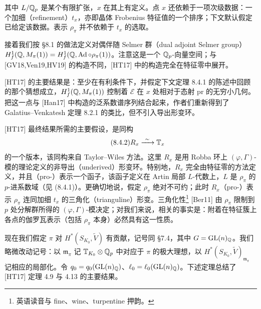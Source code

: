
其中 $L/\mathbb{Q}_p$ 是某个有限扩张，$x$ 在其上有定义。点 $x$ 还依赖于一项次级数据：一个加细（refinement）$t_x$，亦即晶体 Frobenius 特征值的一个排序；下文默认假定已给定该数据。表示 $\rho_\pi$ 并不依赖于 $t_x$ 的选取。

接着我们按 §8.1 的做法定义对偶伴随 Selmer 群（dual adjoint Selmer group）$H^1_f(\mathbb{Q},M_\pi(1))=H^1_f(\mathbb{Q},\operatorname{Ad}\circ\rho_\pi(1))$。注意这是一个 $\mathbb{Q}_p$-向量空间；与 [GV18,Ven19,HV19] 的构造不同，[HT17] 中的构造完全在特征零中展开。

[HT17] 的主要结果是：至少在有利条件下，并假定下文定理 8.4.1 的陈述中回顾的那个猜想成立，$H^1_f(\mathbb{Q},M_\pi(1))$ 控制着 $\mathcal E$ 在 $x$ 处相对于态射 $\mathrm{pr}$ 的无穷小几何。把这一点与 [Han17] 中构造的泛系数谱序列结合起来，作者们重新得到了 Galatius–Venkatesh 定理 8.2.1 的类比，但不引入导出形变环。

[HT17] 最终结果所需的主要假设，是同构
\begin{equation}\tag{8.4.2}\label{eq:a6-06-1}
R_x\xrightarrow{\ \sim\ }\mathbb T_x
\end{equation}
的一个版本，该同构来自 Taylor–Wiles 方法。这里 $R_x$ 是用 Robba 环上 $(\varphi,\Gamma)$-模的理论定义的非导出（underived）形变环。特别地，$R_x$ 完全由特征零的方法定义，并且（pro-）表示一个函子，该函子定义在 Artin 局部 $L$-代数上，$L$ 是 $\rho_\pi$ 的 $p$-进系数域（见 (8.4.1)）。更确切地说，假定 $\rho_\pi$ 绝对不可约；此时 $R_x$（pro-）表示 $\rho_\pi$ 连同加细 $t_x$ 的三角化（trianguline）形变。三角化性\footnote{英语读音与 fine、wine、turpentine 押韵。} [Ber11] 由 $\rho_\pi$ 限制到 $p$ 处分解群所得的 $(\varphi,\Gamma)$-模决定；对我们来说，相关的事实是：附着在特征簇上各点的伽罗瓦表示（包括 $\rho_\pi$ 本身）必然具有这一性质。

现在我们假定 $\pi$ 对 $H^*(S_{K_0},\tilde V)$ 有贡献，记号同 §7.4，其中 $G=\mathrm{GL}(n)_{\mathbb{Q}}$。我们略微改动记号：以 $\mathfrak m_\pi$ 记 $\mathbb T_{K_0}\otimes\mathbb{Q}_p$ 中对应于 $\pi$ 的极大理想，以 $H^*(S_{K_0},\tilde V)_{\mathfrak m_\pi}$ 记相应的局部化。令 $q_0=q_0(\mathrm{GL}(n)_{\mathbb{Q}})$、$\ell_0=\ell_0(\mathrm{GL}(n)_{\mathbb{Q}})$。下述定理总结了 [HT17] 定理 4.9 与 4.13 的主要结果。

